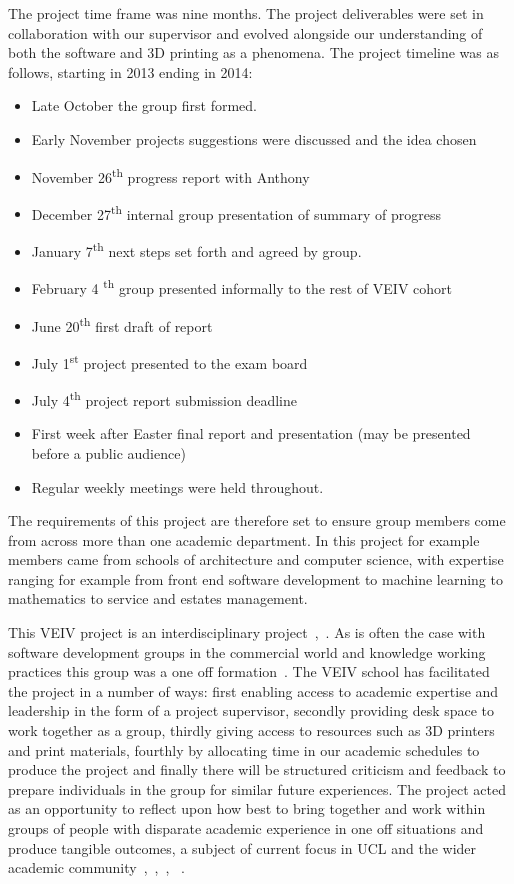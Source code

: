 \documentclass[pdftex, 11pt]{report} %
\begin{document}
The project time frame was nine months. The project deliverables were set in collaboration with our supervisor and evolved alongside our understanding of both the software and 3D printing as a phenomena. The project timeline was as follows, starting in 2013 ending in 2014:

\begin{itemize}
\item Late October the group first formed. 
\item Early November projects suggestions were discussed and the idea chosen 
\item November 26\textsuperscript{th} progress report with Anthony 
\item December 27\textsuperscript{th} internal group presentation of summary of progress 
\item January 7\textsuperscript{th} next steps set forth and agreed by group.
\item February 4 \textsuperscript{th} group presented informally to the rest of VEIV cohort 
\item June 20\textsuperscript{th} first draft of report 
\item July 1\textsuperscript{st} project presented to the exam board
\item July 4\textsuperscript{th} project report submission deadline 
\item First week after Easter final report and presentation (may be presented before a public audience)
\item Regular weekly meetings were held throughout. 
\end{itemize}

The requirements of this project are therefore set to ensure group members come from across more than one academic department. In this project for example members came from schools of architecture and computer science, with expertise ranging for example from front end software development to machine learning to mathematics to service and estates management. 

This VEIV project is an interdisciplinary project~\cite{Davies2011},~\cite{Falk-Krzesinski2011}. As is often the case with software development groups in the commercial world and knowledge working practices this group was a one off formation~\cite{Sproull2000}. The VEIV school has facilitated the project in a number of ways: first enabling access to academic expertise and leadership in the form of a project supervisor, secondly providing desk space to work together as a group, thirdly giving access to resources such as 3D printers and print materials, fourthly by allocating time in our academic schedules to produce the project and finally there will be structured criticism and feedback to prepare individuals in the group for similar future experiences. The project acted as an opportunity to reflect upon how best to bring together and work within groups of people with disparate academic experience in one off situations and produce tangible outcomes, a subject of current focus in UCL and the wider academic community~\cite{Klein2006},~\cite{Wagner2011},~\cite{NationalResearchCouncil2005}, ~\cite{Hadorn2010}. 
\end{document}
